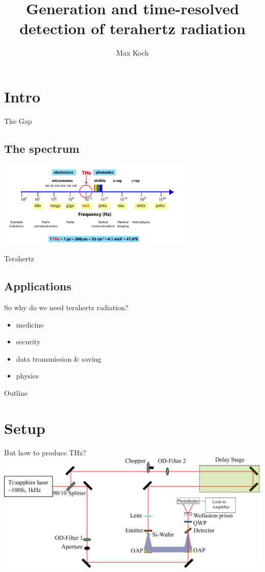 \documentclass[aspectratio=1610, 9pt]{beamer}
\title{Generation and time-resolved detection of
terahertz radiation}
\author[M.~Koch]{Max Koch}
\institute[AG Wang]{Arbeitsgruppe Wang \\  Fakultät Physik}
\begin{document}
\maketitle

\section{Intro}

\begin{frame}{The Gap}
  \subsection{The spectrum}
  \begin{center}
  \includegraphics[width=0.7\textwidth]{images/spectrum.png}
  \end{center}
\end{frame}


\begin{frame}{Terahertz}
  \subsection{Applications}
  So why do we need terahertz radiation?
  \begin{itemize}
    \item medicine
    \item security
    \item data transmission \& saving
    \item physics
  \end{itemize}
\end{frame}

\begin{frame}{Outline}
  \tableofcontents
\end{frame}

\section{Setup}

\begin{frame}{But how to produce THz?}
  \includegraphics[width=\textwidth]{images/Aufbau.pdf}
\end{frame}
\end{document}
